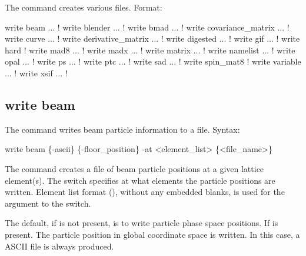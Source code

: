 {{{{{{{{{{{The  command creates various files.
Format:
\begin{example}
  write beam ...                  ! 
  write blender ...               ! 
  write bmad ...                  ! 
  write covariance_matrix ...     ! 
  write curve ...                 ! 
  write derivative_matrix ...     ! 
  write digested ...              ! 
  write gif ...                   ! 
  write hard                      ! 
  write mad8 ...                  ! 
  write madx ...                  ! 
  write matrix ...                ! 
  write namelist ...              ! 
  write opal ...                  ! 
  write ps ...                    !   
  write ptc ...                   ! 
  write sad ...                   ! 
  write spin_mat8                 ! 
  write variable ...              ! 
  write xsif ...                  ! 
\end{example}



\subsection{write beam}
\label{s:write.beam}

The  command writes beam particle information to a file.
Syntax:
\begin{example}
    write beam \{-ascii\} \{-floor_position\} -at <element_list> \{<file_name>\} 
\end{example}

The  command creates a file of beam particle positions at a given lattice element(s). The
 switch specifies at what elements the particle positions are written. Element list format
(), without any embedded blanks, is used for the 
argument to the  switch. 

The default, if  is not present, is to write particle phase space positions.
If  is present. The particle position in global coordinate space is written.
In this case, a ASCII file is always produced.

}}}}}}}}}}}
